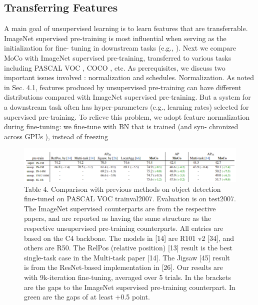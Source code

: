 \documentclass[10pt,twocolumn]{article}  %
\begin{document}
\subsection{Transferring Features}
A main goal of unsupervised learning is to learn features
that are transferrable. ImageNet supervised pre-training is
most inﬂuential when serving as the initialization for ﬁne-
tuning in downstream tasks (e.g., \cite{21_girshick2014rich,20_girshick2015fast, 43_long2015fully, 52_ren2015faster}). Next
we compare MoCo with ImageNet supervised pre-training,
transferred to various tasks including PASCAL VOC \cite{18_everingham2010pascal},
COCO \cite{42_lin2014microsoft}, etc. As prerequisites, we discuss two important
issues involved \cite{31_he2019rethinking}: normalization and schedules.
Normalization. As noted in Sec. 4.1, features produced by
unsupervised pre-training can have different distributions
compared with ImageNet supervised pre-training. But a
system for a downstream task often has hyper-parameters
(e.g., learning rates) selected for supervised pre-training. To
relieve this problem, we adopt feature normalization during
ﬁne-tuning: we ﬁne-tune with BN that is trained (and syn-
chronized across GPUs \cite{49_peng2018megdet}), instead of freezing

\FloatBarrier
\begin{figure}[t!]
    \centering
    \includegraphics[width=1\linewidth]{Pic/table4.png} %
    \captionsetup{labelformat=empty} %
    \caption{Table 4. Comparison with previous methods on object detection ﬁne-tuned on PASCAL VOC trainval2007. Evaluation is on
    test2007. The ImageNet supervised counterparts are from the respective papers, and are reported as having the same structure as the
    respective unsupervised pre-training counterparts. All entries are based on the C4 backbone. The models in [14] are R101 v2 [34], and
    others are R50. The RelPos (relative position) [13] result is the best single-task case in the Multi-task paper [14]. The Jigsaw [45] result is
    from the ResNet-based implementation in [26]. Our results are with 9k-iteration ﬁne-tuning, averaged over 5 trials. In the brackets are the
    gaps to the ImageNet supervised pre-training counterpart. In green are the gaps of at least +0.5 point.} %
    \label{fig:Table 4} %
\end{figure}
\end{document}
